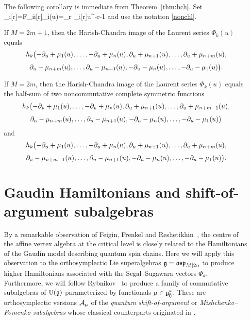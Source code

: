 \documentclass[12pt]{article}
\begin{document}
The following corollary is immediate from Theorem~\ref{thm:hch}. Set
\ben
\mu_i[r]=F_{ii}[r]\Fand \mu_i(u)=\sum_{r\in\ZZ} \mu_i[r]\tss u^{-r-1}
\een
and use the notation \eqref{nonchl}.

\bco\label{cor:hchss}
If $M=2m+1$, then the Harish-Chandra image of the Laurent series $\Phi_k(u)$ equals
\begin{multline}\nonumber
h_k\big({-}\partial_u+\mu_{1}(u),\dots,-\partial_u+\mu_{n}(u),\partial_u+\mu_{n+1}(u),\dots,\partial_u+\mu_{n+m}(u),\\[0.3em]
\partial_u-\mu_{n+m}(u),\dots,\partial_u-\mu_{n+1}(u),
-\partial_u-\mu_{n}(u),\dots,-\partial_u-\mu_{1}(u)\big).
\end{multline}
\par
If $M=2m$, then the Harish-Chandra image of the Laurent series $\Phi_k(u)$
equals
the half-sum of two
noncommutative complete symmetric functions
\begin{multline}\nonumber
h_k\big({-}\partial_u+\mu_{1}(u),\dots,-\partial_u+\mu_{n}(u),\partial_u+\mu_{n+1}(u),\dots,\partial_u+\mu_{n+m-1}(u),\\[0.3em]
\partial_u-\mu_{n+m}(u),\dots,\partial_u-\mu_{n+1}(u),
-\partial_u-\mu_{n}(u),\dots,-\partial_u-\mu_{1}(u)\big)
\end{multline}
and
\begin{multline}\nonumber
h_k\big({-}\partial_u+\mu_{1}(u),\dots,-\partial_u+\mu_{n}(u),\partial_u+\mu_{n+1}(u),\dots,\partial_u+\mu_{n+m}(u),\\[0.3em]
\partial_u-\mu_{n+m-1}(u),\dots,\partial_u-\mu_{n+1}(u),
-\partial_u-\mu_{n}(u),\dots,-\partial_u-\mu_{1}(u)\big).
\end{multline}
\eco


\section{Gaudin Hamiltonians and shift-of-argument subalgebras}
\label{sec:gh}

By a remarkable observation of Feigin, Frenkel and Reshetikhin~\cite{ffr:gm},
the centre of the affine vertex algebra at the critical level
is closely related to the Hamiltonians of the Gaudin model
describing quantum spin chains. Here we will apply this observation
to the orthosymplectic Lie superalgebras $\mathfrak{g}=\mathfrak{osp}_{M|2n}$ to produce
higher Hamiltonians associated with the Segal--Sugawara vectors $\Phi_k$.
Furthermore, we will follow Rybnikov~\cite{r:si} to produce a family
of commutative subalgebras of ${\rm U}(\mathfrak{g})$ parameterized by
functionals $\mu\in\mathfrak{g}^*_{\bar 0}$. These are orthosymplectic versions ${\mathcal A}_{\mu}$ of the
{\em quantum shift-of-argument} or {\em Mishchenko--Fomenko subalgebras}
whose classical counterparts
originated in \cite{mf:ee}.
\end{document}

